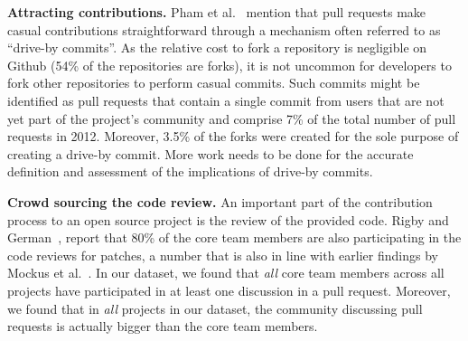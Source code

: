 \documentclass{sig-alternate}
\begin{document}
%
\textbf{Attracting contributions.} Pham et al.~\cite{Pham13} mention
that pull requests make casual contributions straightforward through
a mechanism often referred to as ``drive-by commits''. As the
relative cost to fork a repository is negligible on Github (54\% of the
repositories are forks), it is not uncommon for developers to fork other
repositories to perform casual commits.
Such commits might be identified
as pull requests that contain a single commit from users that are not yet part
of the project's community and comprise 7\% of the total number of pull
requests in 2012. Moreover, 3.5\% of the
forks were created for the sole purpose of creating a drive-by commit. More
work needs to be done for the accurate definition and assessment of the
implications of drive-by commits.

\textbf{Crowd sourcing the code review.}
An important part of the contribution process to an open source project is the
review of the provided code. Rigby and German~\cite{Rigby06},
report that 80\% of the core team members are also participating in the code
reviews for patches, a number that is also in line with earlier findings by
Mockus et al.~\cite{MOCKU02}. In our dataset, we found that \emph{all} core
team members across all projects have participated in at least
one discussion in a pull request. Moreover, we found that in \emph{all} projects
in our dataset, the community discussing pull requests is actually bigger
than the core team members.
\end{document}
